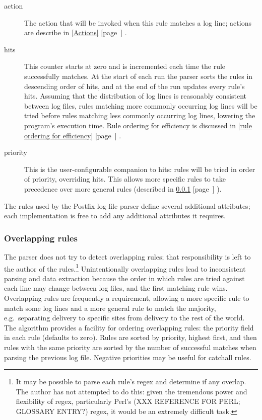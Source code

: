 \documentclass[]{svmult}
\newcommand{\refwithpage}[1]{%
    \empty{}\ref{#1} [page~\pageref{#1}]%
}
\newcommand{\sectionref}[1]{%
    \textsection{}\refwithpage{#1}%
}
\begin{document}
\begin{description}
    \item [action] The action that will be invoked when this rule matches a
        log line; actions are describe in \sectionref{Actions}.

    \item [hits] This counter starts at zero and is incremented each time
        the rule successfully matches.  At the start of each run the parser
        sorts the rules in descending order of hits, and at the end of the
        run updates every rule's hits.  Assuming that the distribution of
        log lines is reasonably consistent between log files, rules
        matching more commonly occurring log lines will be tried before
        rules matching less commonly occurring log lines, lowering the
        program's execution time.  Rule ordering for efficiency is
        discussed in \sectionref{rule ordering for efficiency}.

    \item [priority] This is the user-configurable companion to hits: rules
        will be tried in order of priority, overriding hits.  This allows
        more specific rules to take precedence over more general rules
        (described in \sectionref{overlapping rules}).

\end{description}

The rules used by the Postfix log file parser define several additional
attributes; each implementation is free to add any additional attributes it
requires.

\subsubsection{Overlapping rules}

\label{overlapping rules}

The parser does not try to detect overlapping rules; that responsibility is
left to the author of the rules.\footnote{It may be possible to parse
each rule's regex and determine if any overlap.  The author has not
attempted to do this: given the tremendous power and flexibility of
regex, particularly Perl's (XXX REFERENCE FOR PERL\@; GLOSSARY ENTRY?)
regex, it would be an extremely difficult task.} Unintentionally
overlapping rules lead to inconsistent parsing and data extraction because
the order in which rules are tried against each line may change between log
files, and the first matching rule wins.  Overlapping rules are frequently
a requirement, allowing a more specific rule to match some log lines and a
more general rule to match the majority, e.g.\ separating \SMTP{} delivery
to specific sites from \SMTP{} delivery to the rest of the world.  The
algorithm provides a facility for ordering overlapping rules: the priority
field in each rule (defaults to zero).  Rules are sorted by priority,
highest first, and then rules with the same priority are sorted by the
number of successful matches when parsing the previous log file.  Negative
priorities may be useful for catchall rules.
\end{document}
